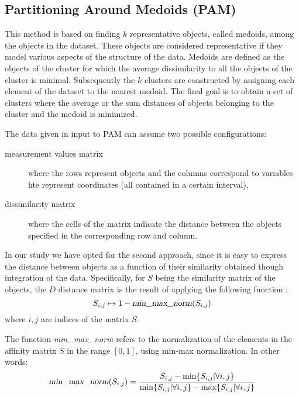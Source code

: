 \subsection{Partitioning Around Medoids (PAM)}\label{clustering_PAM}
This method is based on finding $k$ representative objects, called medoids, among the objects in the dataset. These objects are considered representative if they model various aspects of the structure of the data. Medoids are defined as the objects of the cluster for which the average dissimilarity to all the objects of the cluster is minimal. Subsequently the $k$ clusters are constructed by assigning each element of the dataset to the nearest medoid. The final goal is to obtain a set of clusters where the average or the sum distances of objects belonging to the cluster and the medoid is minimized.

The data given in input to PAM can assume two possible configurations:
\begin{description}
    \item[measurement values matrix] where the rows represent objects and the columns correspond to variables hte represent coordinates (all contained in a certain interval),
    \item[dissimilarity matrix] where the cells of the matrix indicate the distance between the objects specified in the corresponding row and column.
\end{description}
In our study we have opted for the second approach, since it is easy to express the distance between objects as a function of their similarity obtained though integration of the data. Specifically, for $S$ being the similarity matrix of the objects, the $D$ distance matrix is the result of applying the following function :
\begin{equation*}
    S_{i,j} \mapsto 1 - \text{\textsl{min\_max\_norm}}(S_{i,j})
\end{equation*} 
where $i,j$ are indices of the matrix $S$.

The function \textsl{min\_max\_norm} refers to the normalization of the elements in the affinity matrix $S$ in the range $\left[0, 1\right]$, using min-max normalization. In other words: 
\begin{equation*}
    \text{\textsl{min\_max\_norm}}(S_{i,j}) = \frac{S_{i,j}-\text{min}\{S_{i,j}|\forall i,j\}}{\text{min}\{S_{i,j}|\forall i,j\}-\text{max}\{S_{i,j}|\forall i,j\}}
\end{equation*}
\newline

